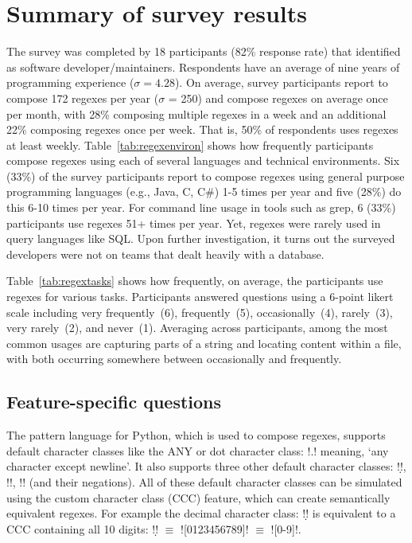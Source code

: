 \section{Summary of survey results}

The survey was completed by 18 participants (82\% response rate) that identified as software developer/maintainers.
Respondents have an average of nine years of programming experience ($\sigma = 4.28$).
On average, survey participants report to compose 172 regexes per year ($\sigma$ = 250) and compose regexes on average once per month, with 28\% composing multiple regexes in a week and an additional 22\% composing regexes once per week. That is, 50\% of respondents uses regexes at least weekly.
Table~\ref{tab:regexenviron} shows how frequently participants compose regexes using each of several languages and technical environments.
Six (33\%) of the survey participants report to compose regexes using general purpose programming languages (e.g., Java, C, C\#) 1-5 times per year and five (28\%) do this 6-10 times per year.  For command line usage in tools such as grep, 6 (33\%) participants use regexes 51+ times per year. Yet, regexes were rarely used in query languages like SQL. Upon further investigation, it turns out the surveyed developers were not on teams that dealt heavily with a database.





Table~\ref{tab:regextasks} shows how frequently, on average, the participants use
regexes for various tasks.
Participants answered questions using a 6-point likert scale including very frequently~(6), frequently~(5), occasionally~(4), rarely~(3), very rarely~(2), and never~(1).
Averaging across participants, among the most common usages are capturing parts of a string and locating content within a file, with both occurring somewhere between occasionally and frequently.





\subsection{Feature-specific questions}
The pattern language for Python, which is used to compose regexes, supports default character classes like the ANY or dot character class: \cverb!.! meaning, `any character except newline'.
It also supports three other default character classes: \cverb!\d!, \cverb!\w!, \cverb!\s! (and their negations). All of these default character classes can be simulated using the custom character class (CCC) feature, which can create semantically equivalent regexes.
For example  the decimal character class: \cverb!\d! is equivalent to a CCC containing all 10 digits:  \cverb!\d! $\equiv$ \cverb![0123456789]! $\equiv$ \cverb![0-9]!.

